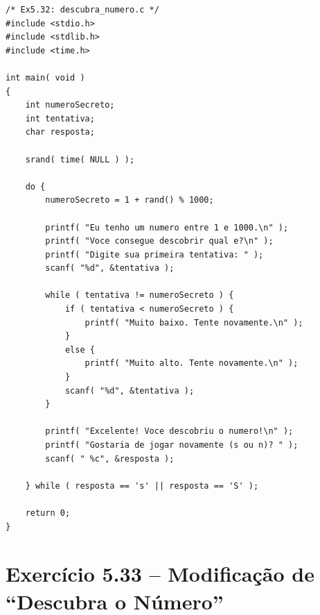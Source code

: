 \documentclass[12pt,a4paper]{article}
\begin{document}
\begin{respostabox}
\begin{lstlisting}
/* Ex5.32: descubra_numero.c */
#include <stdio.h>
#include <stdlib.h>
#include <time.h>

int main( void )
{
    int numeroSecreto;
    int tentativa;
    char resposta;

    srand( time( NULL ) );

    do {
        numeroSecreto = 1 + rand() % 1000;

        printf( "Eu tenho um numero entre 1 e 1000.\n" );
        printf( "Voce consegue descobrir qual e?\n" );
        printf( "Digite sua primeira tentativa: " );
        scanf( "%d", &tentativa );

        while ( tentativa != numeroSecreto ) {
            if ( tentativa < numeroSecreto ) {
                printf( "Muito baixo. Tente novamente.\n" );
            }
            else {
                printf( "Muito alto. Tente novamente.\n" );
            }
            scanf( "%d", &tentativa );
        }

        printf( "Excelente! Voce descobriu o numero!\n" );
        printf( "Gostaria de jogar novamente (s ou n)? " );
        scanf( " %c", &resposta );

    } while ( resposta == 's' || resposta == 'S' );

    return 0;
}
\end{lstlisting}
\end{respostabox}

\newpage

\section{Exercício 5.33 -- Modificação de ``Descubra o Número''}
\end{document}
